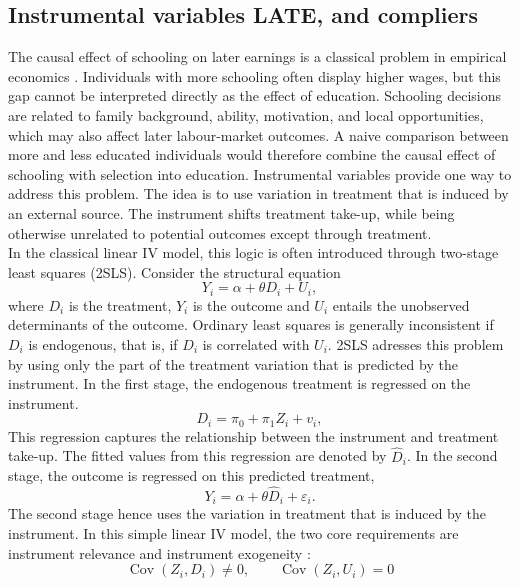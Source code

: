 \documentclass[12pt, a4paper, oneside]{article}
\theoremstyle{plain}
\theoremstyle{definition}
\begin{document}
\subsection{Instrumental variables LATE, and compliers}
The causal effect of schooling on later earnings is a classical problem in empirical economics
\citep{griliches1977estimating,card1993using}.
Individuals with more schooling often display higher wages, but this gap cannot be interpreted directly as the effect of education.
Schooling decisions are related to family background, ability, motivation, and local opportunities,
which may also affect later labour-market outcomes.
A naive comparison between more and less educated individuals would therefore combine the causal effect of schooling with selection into education.
Instrumental variables provide one way to address this problem. The idea is to use variation in treatment that is induced by an external source. The instrument shifts treatment take-up, while being otherwise unrelated to potential outcomes except through treatment.\\
In the classical linear IV model, this logic is often introduced through two-stage least squares (2SLS).
Consider the structural equation
\begin{equation}
    Y_i = \alpha + \theta D_i + U_i,
\end{equation}
where $D_i$ is the treatment, $Y_i$ is the outcome and $U_i$ entails the unobserved determinants of the outcome. 
Ordinary least squares is generally inconsistent if 
$D_i$ is endogenous, that is, if $D_i$ is correlated with $U_i$.
2SLS adresses this problem by using only the part of the treatment variation that is predicted by the instrument. 
In the first stage, the endogenous treatment is regressed on the instrument. \begin{equation}
D_i = \pi_0 + \pi_1 Z_i + v_i,
\end{equation}
This regression captures the relationship between the instrument and treatment take-up. The fitted values from this regression are denoted by $\widehat D_i$. In the second stage, the outcome is regressed on this predicted treatment,
\begin{equation}
Y_i = \alpha + \theta \widehat D_i + \varepsilon_i.
\end{equation}
The second stage hence uses the variation in treatment that is induced by the instrument.
In this simple linear IV model, the two core requirements are instrument relevance and instrument exogeneity \citep{wooldridge2016introductory}:
\begin{equation}
\operatorname{Cov}(Z_i, D_i) \neq 0, \qquad \operatorname{Cov}(Z_i, U_i) = 0   
\end{equation}
\end{document}
